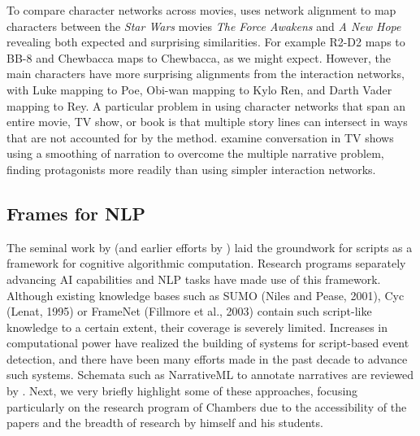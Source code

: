 {To compare character networks across movies, \cite{ruths2016force} uses network alignment to map characters between the \textit{Star Wars} movies \textit{The Force Awakens} and \textit{A New Hope} revealing both expected and surprising similarities.
For example R2-D2 maps to BB-8 and Chewbacca maps to Chewbacca, as we might expect.
However, the main characters have more surprising alignments from the interaction networks, with Luke mapping to Poe, Obi-wan mapping to Kylo Ren, and Darth Vader mapping to Rey.
A particular problem in using character networks that span an entire movie, TV show, or book is that multiple story lines can intersect in ways that are not accounted for by the method.
\cite{bost2016narrative} examine conversation in TV shows using a smoothing of narration to overcome the multiple narrative problem, finding protagonists more readily than using simpler interaction networks.

\subsection{Frames for NLP}
\label{subsec:frames-NLP}

The seminal work by \cite{schank1977scripts} (and earlier efforts by \cite{rumelhart1975notes}) laid the groundwork for scripts as a framework for cognitive algorithmic computation.
Research programs separately advancing AI capabilities and NLP tasks have made use of this framework.
Although existing knowledge bases such as SUMO (Niles and Pease, 2001), Cyc (Lenat, 1995) or FrameNet (Fillmore et al., 2003) contain such script-like knowledge to a certain extent, their coverage is severely limited.
Increases in computational power have realized the building of systems for script-based event detection, and there have been many efforts made in the past decade to advance such systems.
Schemata such as NarrativeML to annotate narratives are reviewed by \cite{mani2012computational}.
Next, we very briefly highlight some of these approaches, focusing particularly on the research program of Chambers due to the accessibility of the papers and the breadth of research by himself and his students.

}

